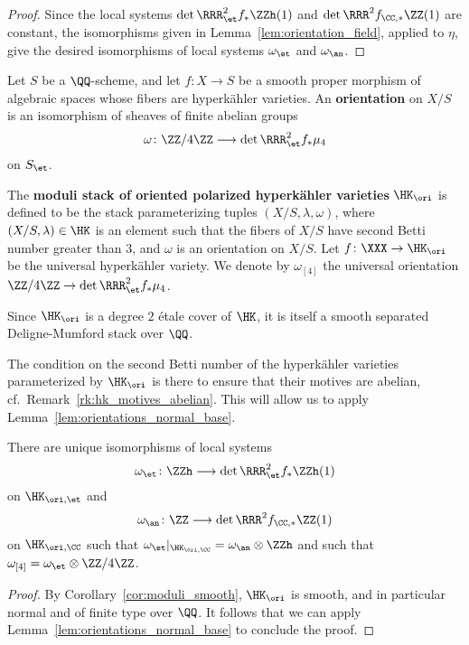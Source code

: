 \begin{proof}
Since the local systems $\det \RRR_{\et}^2 f_* \ZZh(1)$ and $\det \RRR^2 f_{\CC,*} \ZZ(1)$ are constant, the isomorphisms given in Lemma~\ref{lem:orientation_field}, applied to $\eta$, give the desired isomorphisms of local systems $\omega_{\et}$ and $\omega_{\an}$.
\end{proof}

\begin{definition}
Let $S$ be a $\QQ$-scheme, and let $f\colon X \rightarrow S$ be a smooth proper morphism of algebraic spaces whose fibers are hyperk\"ahler varieties. An {\bfseries orientation} on $X/S$ is an isomorphism of sheaves of finite abelian groups
$$
\omega\colon \ZZ/4\ZZ \longrightarrow \det \RRR_{\et}^2 f_* \mu_4
$$
on $S_{\et}$.

The {\bfseries moduli stack of oriented polarized hyperk\"ahler varieties} $\HK_{\ori}$ is defined to be the stack parameterizing tuples $(X/S,\lambda,\omega)$, where $(X/S,\lambda) \in \HK$ is an element such that the fibers of $X/S$ have second Betti number greater than $3$, and $\omega$ is an orientation on $X/S$. Let $f\colon \XXX \rightarrow \HK_{\ori}$ be the universal hyperk\"ahler variety. We denote by $\omega_{[4]}$ the universal orientation $\ZZ/4\ZZ \rightarrow \det \RRR^2_{\et} f_* \mu_4$.
\end{definition}

\begin{remark}
Since $\HK_{\ori}$ is a degree $2$ \'etale cover of $\HK$, it is itself a smooth separated Deligne-Mumford stack over $\QQ$.
\end{remark}

\begin{remark}
The condition on the second Betti number of the hyperk\"ahler varieties parameterized by $\HK_{\ori}$ is there to ensure that their motives are abelian, cf.\ Remark~\ref{rk:hk_motives_abelian}. This will allow us to apply Lemma~\ref{lem:orientations_normal_base}.
\end{remark}

\begin{theorem}\label{thm:hk_orientations}
There are unique isomorphisms of local systems
$$
\omega_{\et}\colon \ZZh \longrightarrow \det \RRR^2_{\et} f_* \ZZh(1)
$$
on $\HK_{\ori,\et}$ and
$$
\omega_{\an}\colon \ZZ \longrightarrow \det \RRR^2 f_{\CC,*} \ZZ(1)
$$
on $\HK_{\ori,\CC}$ such that $\omega_{\et}|_{\HK_{\ori,\CC}} = \omega_{\an} \otimes \ZZh$ and such that $\omega_{[4]} = \omega_{\et} \otimes \ZZ/4\ZZ$.
\end{theorem}
\begin{proof}
By Corollary~\ref{cor:moduli_smooth}, $\HK_{\ori}$ is smooth, and in particular normal and of finite type over $\QQ$. It follows that we can apply Lemma~\ref{lem:orientations_normal_base} to conclude the proof.
\end{proof}

